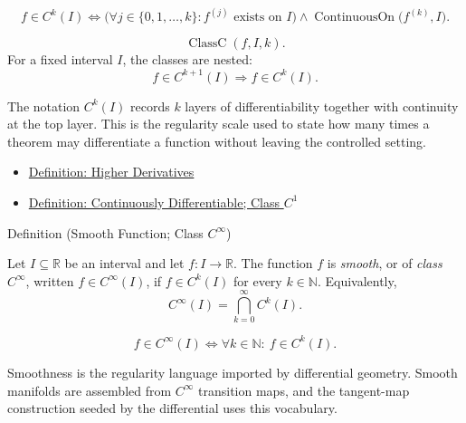 \begin{remark*}
\[
  f\in C^k(I)
  \Longleftrightarrow
  \bigl(\forall j\in\{0,1,\ldots,k\}: f^{(j)}\text{ exists on }I\bigr)
  \land
  \operatorname{ContinuousOn}\bigl(f^{(k)},I\bigr).
\]
\end{remark*}

\begin{remark*}
\[
  \operatorname{ClassC}(f,I,k).
\]
For a fixed interval \(I\), the classes are nested:
\[
  f\in C^{k+1}(I)\Longrightarrow f\in C^k(I).
\]
\end{remark*}

\begin{remark*}[Interpretation]
The notation \(C^k(I)\) records \(k\) layers of differentiability together with continuity at the top layer. This is the regularity scale used to state how many times a theorem may differentiate a function without leaving the controlled setting.
\end{remark*}

\begin{dependencies}
\begin{itemize}
  \item \hyperref[def:higher-derivatives]{Definition: Higher Derivatives}
  \item \hyperref[def:class-c1]{Definition: Continuously Differentiable; Class \(C^1\)}
\end{itemize}
\end{dependencies}

\begin{definitionbox}{Definition (Smooth Function; Class \(C^\infty\))}
\begin{definition}
\label{def:class-cinfty}
Let \(I\subseteq\mathbb{R}\) be an interval and let \(f:I\to\mathbb{R}\). The function \(f\) is \emph{smooth}, or of \emph{class \(C^\infty\)}, written \(f\in C^\infty(I)\), if \(f\in C^k(I)\) for every \(k\in\mathbb{N}\). Equivalently,
\[
  C^\infty(I)=\bigcap_{k=0}^{\infty}C^k(I).
\]
\end{definition}
\end{definitionbox}

\begin{remark*}
\[
  f\in C^\infty(I)
  \Longleftrightarrow
  \forall k\in\mathbb{N}:\ f\in C^k(I).
\]
\end{remark*}

\begin{remark*}[Interpretation]
Smoothness is the regularity language imported by differential geometry. Smooth manifolds are assembled from \(C^\infty\) transition maps, and the tangent-map construction seeded by the differential uses this vocabulary.
\end{remark*}

